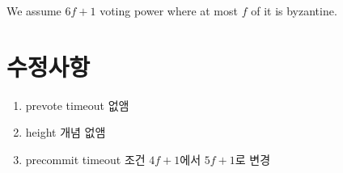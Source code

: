 \documentclass[conference,onecolumn]{IEEEtran}
\begin{document}
We assume $6f+1$ voting power where at most $f$ of it is byzantine.

\section{수정사항}


\begin{enumerate}
	\item prevote timeout 없앰
	\item height 개념 없앰
	\item precommit timeout 조건 $4f+1$에서 $5f+1$로 변경 
\end{enumerate}
\end{document}
